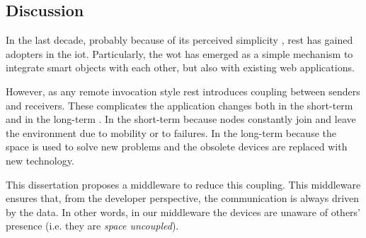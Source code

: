 \subsection{Discussion}


In the last decade, probably because of its perceived simplicity \citep{guinard_search_2011}, \ac{rest} has gained adopters in the \ac{iot}.
Particularly, the \ac{wot} has emerged as a simple mechanism to integrate smart objects with each other, but also with existing web applications.

However, as any remote invocation style \ac{rest} introduces coupling between senders and receivers.
These complicates the application changes both in the short-term and in the long-term \citep{johanson_extending_2004}.
In the short-term because nodes constantly join and leave the environment due to mobility or to failures.
In the long-term because the space is used to solve new problems and the obsolete devices are replaced with new technology.

This dissertation proposes a middleware to reduce this coupling.
This middleware ensures that, from the developer perspective, the communication is always driven by the data.
In other words, in our middleware the devices are unaware of others' presence (i.e. they are \emph{space uncoupled}).